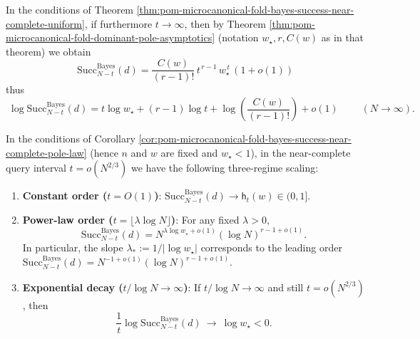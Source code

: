 \begin{corollary}\label{cor:pom-microcanonical-fold-bayes-success-near-complete-pole-law}
In the conditions of Theorem \ref{thm:pom-microcanonical-fold-bayes-success-near-complete-uniform}, if furthermore \(t\to\infty\),
then by Theorem \ref{thm:pom-microcanonical-fold-dominant-pole-asymptotics} (notation \(w_\star,r,C(w)\) as in that theorem) we obtain
\[
\boxed{\;
\mathrm{Succ}^{\mathrm{Bayes}}_{N-t}(d)
=\frac{C(w)}{(r-1)!}\,t^{\,r-1}\,w_\star^{\,t}\,(1+o(1))\;}
\]
thus
\[
\boxed{\;
\log \mathrm{Succ}^{\mathrm{Bayes}}_{N-t}(d)
=t\log w_\star+(r-1)\log t+\log\!\left(\frac{C(w)}{(r-1)!}\right)+o(1)\;}
\qquad(N\to\infty).
\]
\end{corollary}

\begin{corollary}\label{cor:pom-microcanonical-fold-bayes-success-phase-diagram}
In the conditions of Corollary \ref{cor:pom-microcanonical-fold-bayes-success-near-complete-pole-law} (hence \(n\) and \(w\) are fixed and \(w_\star<1\)),
in the near-complete query interval \(t=o(N^{2/3})\) we have the following three-regime scaling:
\begin{enumerate}
  \item \textbf{Constant order (\(t=O(1)\))}: \(\mathrm{Succ}^{\mathrm{Bayes}}_{N-t}(d)\to \mathsf{h}_t(w)\in(0,1]\).
  \item \textbf{Power-law order (\(t=\lfloor \lambda\log N\rfloor\))}: For any fixed \(\lambda>0\),
  \[
  \mathrm{Succ}^{\mathrm{Bayes}}_{N-t}(d)
  =N^{\lambda\log w_\star+o(1)}(\log N)^{r-1+o(1)}.
  \]
  In particular, the slope \(\lambda_\ast:=1/|\log w_\star|\) corresponds to the leading order \(\mathrm{Succ}^{\mathrm{Bayes}}_{N-t}(d)=N^{-1+o(1)}(\log N)^{r-1+o(1)}\).
  \item \textbf{Exponential decay (\(t/\log N\to\infty\))}: If \(t/\log N\to\infty\) and still \(t=o(N^{2/3})\), then
  \[
  \frac{1}{t}\log \mathrm{Succ}^{\mathrm{Bayes}}_{N-t}(d)\ \to\ \log w_\star<0.
  \]
\end{enumerate}
\end{corollary}

\endinput

